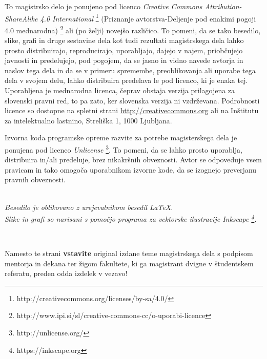 \documentclass[12pt,a4paper,openany,twoside]{book}
\begin{document}
\vspace*{5cm}
{\small \noindent
To magistrsko delo je ponujeno pod licenco \textit{Creative Commons Attribution-ShareAlike 4.0 International}
\footnote{http://creativecommons.org/licenses/by-sa/4.0/} (Priznanje avtorstva-Deljenje pod enakimi pogoji 4.0 mednarodna)
\footnote{http://www.ipi.si/sl/creative-commons-cc/o-uporabi-licence} ali (po želji) novejšo različico.
To pomeni, da se tako besedilo, slike, grafi in druge sestavine dela kot tudi rezultati magistrskega dela lahko prosto distribuirajo,
reproducirajo, uporabljajo, dajejo v najem, priobčujejo javnosti in predelujejo, pod pogojem, da se jasno in vidno navede avtorja in naslov tega
dela in da se v primeru spremembe, preoblikovanja ali uporabe tega dela v svojem delu, lahko distribuira predelava le pod
licenco, ki je enaka tej.
Uporabljena je mednarodna licenca, čeprav obstaja verzija prilagojena za slovenski pravni red, to pa zato, ker slovenska verzija ni vzdrževana.
Podrobnosti licence so dostopne na spletni strani \url{http://creativecommons.org}
ali na Inštitutu za intelektualno lastnino, Streliška 1, 1000 Ljubljana.

\begin{center}%
  \hspace*{1ex}
\end{center}
}

\vspace*{1.5cm}
{\small \noindent
Izvorna koda programske opreme razvite za potrebe magisterskega dela je ponujena pod licenco \textit{Unlicense} \footnote{http://unlicense.org/}.
To pomeni, da se lahko prosto uporablja, distribuira in/ali predeluje, brez nikakršnih obveznosti.
Avtor se odpoveduje vsem pravicam in tako omogoča uporabnikom izvorne kode, da se izognejo preverjanu pravnih obveznosti.
}



\begin{center} 
\ \\ \vfill
{\em Besedilo je oblikovano z urejevalnikom besedil \LaTeX.\\
Slike in grafi so narisani s pomočjo programa za vektorske ilustracije Inkscape \footnote{https://inkscape.org}.}
\end{center}

\newpage
\ \thispagestyle{empty}
\newpage

\thispagestyle{empty}
Namesto te strani {\bf vstavite} original izdane teme magistrskega dela s podpisom mentorja in dekana ter žigom fakultete, ki ga magistrant
dvigne v študent\-skem referatu,  preden odda izdelek v vezavo!
\newpage
\end{document}
